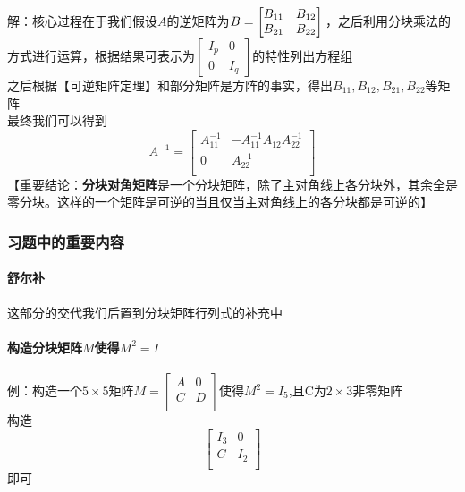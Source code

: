 \documentclass{article}
\begin{document}
\begin{CJK}{UTF8}{gkai}
解：核心过程在于我们假设$A$的逆矩阵为$B=\begin{bmatrix}B_{11}&B_{12}\\B_{21}&B_{22} \end{bmatrix}\\$，之后利用分块乘法的方式进行运算，根据结果可表示为$\begin{bmatrix}I_p&0\\0&I_q\end{bmatrix}$的特性列出方程组\\

之后根据【可逆矩阵定理】和部分矩阵是方阵的事实，得出$B_{11},B_{12},B_{21},B_{22}$等矩阵\\

最终我们可以得到
\[A^{-1}=\begin{bmatrix}
    A_{11}^{-1}&-A_{11}^{-1} A_{12} A_{22}^{-1}\\
    0&A_{22}^{-1}\\
\end{bmatrix}    
    \]
【重要结论：\textbf{分块对角矩阵}是一个分块矩阵，除了主对角线上各分块外，其余全是零分块。这样的一个矩阵是可逆的当且仅当主对角线上的各分块都是可逆的】\\
\subsubsection{习题中的重要内容}
\paragraph{舒尔补\\}
这部分的交代我们后置到分块矩阵行列式的补充中\\

\paragraph{构造分块矩阵$M$使得$M^2=I$\\}
例：构造一个$5\times 5 $矩阵$M=\begin{bmatrix}
A&0\\
C&D\\
\end{bmatrix}$使得$M^2=I_5$,且C为$2\times 3 $非零矩阵\\

构造\[\begin{bmatrix}
I_3&0\\
C&I_2\\
\end{bmatrix}\]
即可\\


\end{CJK}
\end{document}

